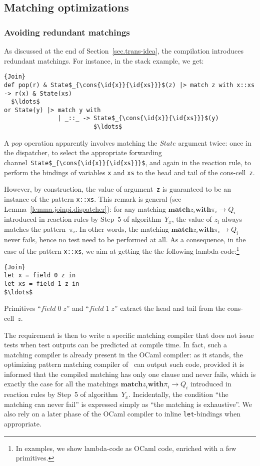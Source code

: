 \documentclass{LMCS}
\let \lst \lstinline
\newcommand{\pt}{\pi}
\newcommand{\ocaml}{\textrm{OCaml}\xspace}
\newcommand{\kwd}[1]{\ensuremath{\mathbf{#1}}}
\newcommand{\prefix}[1]{\mathopen{}\mathrel{\kwd {#1}}}
\newcommand{\infix}[1]{\mathrel{\kwd {#1}}}
\newcommand{\id}[1]{\textit{#1}}
\newcommand{\cons}[2]{#1\mathord{\texttt{::}}#2}
\renewcommand{\_}{\mathord{\rule[-.25ex]{1ex}{.15ex}}}
\newcommand{\matchone}[3]{\prefix{match} #1 \infix{with} #2
  \rightarrow #3}
\begin{document}
\subsection{Matching optimizations}
\label{subsec.optimization}

\subsubsection{Avoiding redundant matchings}
As discussed at the end of Section~\ref{sec.trans-idea},
the compilation introduces redundant matchings.
For instance, in the stack example, we get:
\begin{lstlisting}{Join}
def pop(r) & State$_{\cons{\id{x}}{\id{xs}}}$(z) |> match z with x::xs -> r(x) & State(xs)
  $\ldots$
or State(y) |> match y with
               | _::_ -> State$_{\cons{\id{x}}{\id{xs}}}$(y)
                         $\ldots$
\end{lstlisting}
A $\id{pop}$ operation apparently involves matching the $\id{State}$
argument twice: once in the dispatcher, to select the appropriate
forwarding channel~\lst|State$_{\cons{\id{x}}{\id{xs}}}$|, and again
in the reaction rule, to perform the bindings of variables \lst|x| and
\lst|xs| to the head and tail of the cons-cell~\lst|z|.

However, by construction, the value of argument~\lst|z| is guaranteed
to be an instance of the pattern \lst|x::xs|. This remark is general
(see Lemma~\ref{lemma.joinpi.dispatcher}): for any matching
$\matchone{z_i}{\pt_i}{Q_i}$ introduced in reaction rules by Step~5 of
algorithm~$Y_x$, the value of $z_i$ always matches the
pattern~$\pt_i$.  In other words, the matching
$\matchone{z_i}{\pt_i}{Q_i}$ never fails, hence no test need to be
performed at all. As a consequence, in the case of the pattern
\lst|x::xs|, we aim at getting the the following
lambda-code:\footnote{In examples, we show lambda-code as \ocaml code,
enriched with a few primitives.}
\begin{lstlisting}{Join}
let x = field 0 z in 
let xs = field 1 z in
$\ldots$
\end{lstlisting}
Primitives ``$\id{field}\; 0 \; \id{z}$'' and ``$\id{field}\; 1 \;
\id{z}$'' extract the head and tail from the cons-cell~$\id{z}$.

The requirement is then to write a specific matching compiler that
does not issue tests when test outputs can be predicted at compile
time. In fact, such a matching compiler is already present in the
\ocaml compiler: as it stands, the optimizing pattern matching
compiler of~\cite{LefessantMarangetPattern} can output such code,
provided it is informed that the compiled matching has only one clause
and never fails, which is exactly the case for all the matchings
$\matchone{z_i}{\pt_i}{Q_i}$ introduced in reaction rules by Step~5 of
algorithm~$Y_x$.
Incidentally, the condition ``the matching can never fail'' is
expressed simply as ``the matching is exhaustive''.
We also rely on a later phase of the \ocaml compiler
to inline \lst|let|-bindings when appropriate. 
\end{document}
